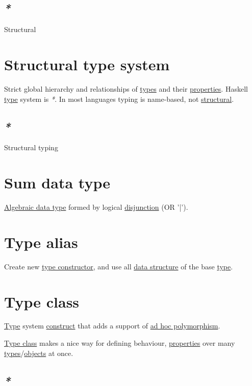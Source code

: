 \documentclass[a4paper,14pt,oneside]{book}
\begin{document}
\subsection{\emph{*}}
\label{sec:orgd7c1cfb}

\label{org97de9c8}Structural

\section{\label{org96a3f4f}Structural type system}
\label{sec:org36138cd}
Strict global hierarchy and relationships of \hyperref[org91cf53a]{types} and their \hyperref[orgaebb0b7]{properties}.
Haskell \hyperref[orgde40363]{type} system is \emph{*}.
In most languages typing is name-based, not \hyperref[org97de9c8]{structural}.

\subsection{\emph{*}}
\label{sec:orgb1cfa65}

\label{orgc039bae}Structural typing

\section{\label{org9215116}Sum data type}
\label{sec:org0ee71a4}
\hyperref[org65222de]{Algebraic data type} formed by logical \hyperref[orge40fe3e]{disjunction} (OR '|').

\section{\label{org8b8683f}Type alias}
\label{sec:org236bcec}
Create new \hyperref[orgb31668f]{type constructor}, and use all \hyperref[org627fed1]{data structure} of the base \hyperref[orgde40363]{type}.

\section{\label{org4b105c4}Type class}
\label{sec:org047ae39}
\hyperref[orgde40363]{Type} system \hyperref[org1a30ca3]{construct} that adds a support of \hyperref[orgc60c447]{ad hoc polymorphism}.

\hyperref[org4b105c4]{Type class} makes a nice way for defining behaviour, \hyperref[orgaebb0b7]{properties} over many \hyperref[org91cf53a]{types}/\hyperref[org88e24d2]{objects} at once.

\subsection{\emph{*}}
\label{sec:orgbf95f0a}
\end{document}
